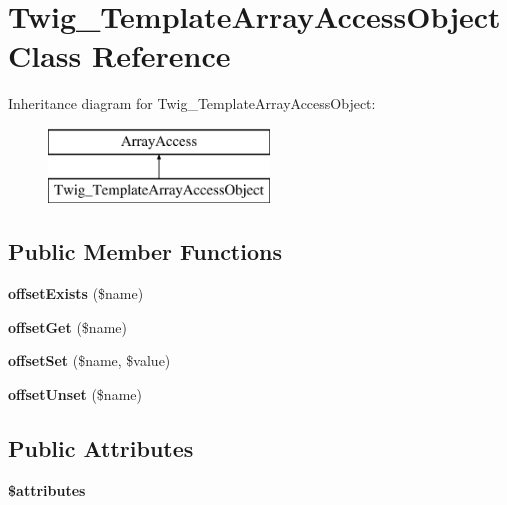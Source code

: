 \hypertarget{classTwig__TemplateArrayAccessObject}{}\section{Twig\+\_\+\+Template\+Array\+Access\+Object Class Reference}
\label{classTwig__TemplateArrayAccessObject}
Inheritance diagram for Twig\+\_\+\+Template\+Array\+Access\+Object\+:\begin{figure}[H]
\begin{center}
\leavevmode
\includegraphics[height=2.000000cm]{classTwig__TemplateArrayAccessObject}
\end{center}
\end{figure}
\subsection*{Public Member Functions}
\begin{DoxyCompactItemize}
\item 
{\bfseries offset\+Exists} (\$name)\hypertarget{classTwig__TemplateArrayAccessObject_a8421b2bbaa779fe4485cd6b190250f76}{}\label{classTwig__TemplateArrayAccessObject_a8421b2bbaa779fe4485cd6b190250f76}

\item 
{\bfseries offset\+Get} (\$name)\hypertarget{classTwig__TemplateArrayAccessObject_ad980acd13be5cee642ff040b8b34da33}{}\label{classTwig__TemplateArrayAccessObject_ad980acd13be5cee642ff040b8b34da33}

\item 
{\bfseries offset\+Set} (\$name, \$value)\hypertarget{classTwig__TemplateArrayAccessObject_a7926e63760633df693c7947f51ef4b28}{}\label{classTwig__TemplateArrayAccessObject_a7926e63760633df693c7947f51ef4b28}

\item 
{\bfseries offset\+Unset} (\$name)\hypertarget{classTwig__TemplateArrayAccessObject_a5fb3fe9e55d0991ddaaa746b35af374f}{}\label{classTwig__TemplateArrayAccessObject_a5fb3fe9e55d0991ddaaa746b35af374f}

\end{DoxyCompactItemize}
\subsection*{Public Attributes}
\begin{DoxyCompactItemize}
\item 
{\bfseries \$attributes}
\end{DoxyCompactItemize}
